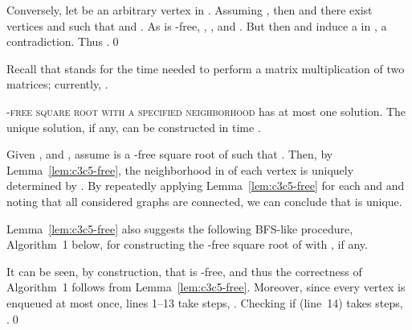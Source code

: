 \documentclass[proceedings]{stacs}
\begin{document}
 Conversely, let  be an arbitrary vertex in .
 Assuming , then  and there exist vertices  and  such that
  and . As  is -free, , ,
 and . But then  and  induce a  in , a contradiction.
 Thus .\qed

Recall that  stands for the time needed to perform a matrix multiplication of two  matrices;
currently, .

\begin{theorem}\label{thm:c3c5-free}
\textsc{-free square root with a specified neighborhood} has at most one solution.
The unique solution, if any, can be constructed in time .
\end{theorem}
\proof Given ,  and , assume  is a -free
square root of  such that . Then, by Lemma~\ref{lem:c3c5-free},
the neighborhood in  of each vertex  is uniquely determined by
. By repeatedly applying Lemma~\ref{lem:c3c5-free}
for each  and  and noting that all considered graphs are
connected, we can conclude that  is unique.

Lemma~\ref{lem:c3c5-free} also suggests the following BFS-like procedure, Algorithm~1
below, for constructing the -free square root  of  with ,
if any.

It can be seen, by construction, that  is -free, and thus the
correctness of Algorithm~1 follows from Lemma~\ref{lem:c3c5-free}. Moreover,
since every vertex is enqueued at most once, lines 1--13 take  steps,
. Checking if  (line~14) takes  steps, .\qed
\end{document}
